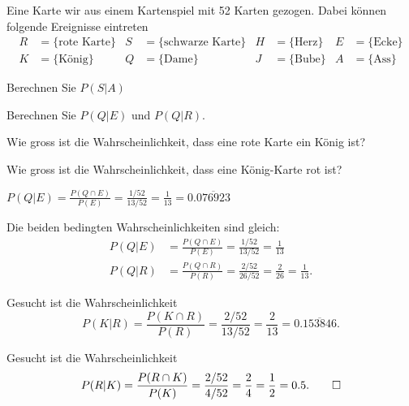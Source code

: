 Eine Karte wir aus einem Kartenspiel mit 52 Karten gezogen.
Dabei können folgende Ereignisse eintreten
\begin{align*}
R&=\{\text{rote Karte}\}
&
S&=\{\text{schwarze Karte}\}
&
H&=\{\text{Herz}\}
&
E&=\{\text{Ecke}\}
\\
K&=\{\text{König}\}
&
Q&=\{\text{Dame}\}
&
J&=\{\text{Bube}\}
&
A&=\{\text{Ass}\}
\end{align*}
\begin{teilaufgaben}
\item
Berechnen Sie $P(S|A)$
\item
Berechnen Sie
$P(Q|E)$
und
$P(Q|R)$.
\item
Wie gross ist die Wahrscheinlichkeit, dass eine rote Karte ein
König ist?
\item
Wie gross ist die Wahrscheinlichkeit, dass eine König-Karte rot ist?
\end{teilaufgaben}

\begin{loesung}
\begin{teilaufgaben}
\item
$
P(Q|E)
=
\frac{P(Q\cap E)}{P(E)}
=
\frac{1/52}{13/52}
=
\frac{1}{13}
=
0.\overline{076923}
$
\item
Die beiden bedingten Wahrscheinlichkeiten sind gleich:
\begin{align*}
P(Q|E)
&=
\frac{P(Q\cap E)}{P(E)} = \frac{1/52}{13/52} = \frac{1}{13}
\\
P(Q|R)
&=
\frac{P(Q\cap R)}{P(R)} = \frac{2/52}{26/52} = \frac{2}{26}
= \frac{1}{13}.
\end{align*}
\item
Gesucht ist die Wahrscheinlichkeit
\[
P(K|R)
=
\frac{P(K\cap R)}{P(R)}
=
\frac{2/52}{13/52}
=
\frac{2}{13}
=
0.\overline{153846}.
\]
\item
Gesucht ist die Wahrscheinlichkeit
\[
P(R|K)
=
\frac{P(R\cap K)}{P(K)}
=
\frac{2/52}{4/52}
=
\frac{2}{4}
=
\frac{1}{2}
=
0.5.
\qedhere
\]
\end{teilaufgaben}
\end{loesung}

